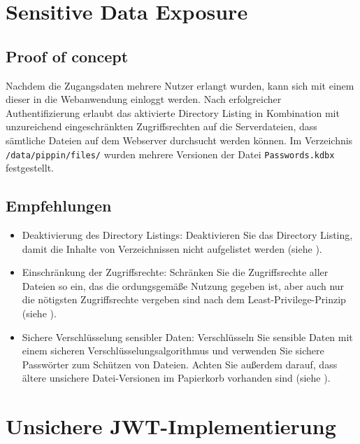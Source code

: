 \section{\makecvssbadge Sensitive Data Exposure}

\subsection*{Proof of concept}
Nachdem die Zugangsdaten mehrere Nutzer erlangt wurden, kann sich mit einem dieser in die Webanwendung einloggt werden. Nach erfolgreicher Authentifizierung erlaubt das aktivierte Directory Listing in Kombination mit unzureichend eingeschränkten Zugriffsrechten auf die Serverdateien, dass sämtliche Dateien auf dem Webserver durchsucht werden können. Im Verzeichnis \texttt{/data/pippin/files/} wurden mehrere Versionen der Datei \texttt{Passwords.kdbx} festgestellt.

\subsection*{Empfehlungen}
\begin{itemize}
    \item Deaktivierung des Directory Listings: Deaktivieren Sie das Directory Listing, damit die Inhalte von Verzeichnissen nicht aufgelistet werden (siehe \cite{owaspSecurityMisconfiguration}).
    \item Einschränkung der Zugriffsrechte: Schränken Sie die Zugriffsrechte aller Dateien so ein, das die ordungsgemäße Nutzung gegeben ist, aber auch nur die nötigsten Zugriffsrechte vergeben sind nach dem Least-Privilege-Prinzip (siehe \cite{owaspSecurityMisconfiguration}).
    \item Sichere Verschlüsselung sensibler Daten: Verschlüsseln Sie sensible Daten mit einem sicheren Verschlüsselungsalgorithmus und verwenden Sie sichere Passwörter zum Schützen von Dateien. Achten Sie außerdem darauf, dass ältere unsichere Datei-Versionen im Papierkorb vorhanden sind (siehe \cite{owaspSecurityMisconfiguration}).
\end{itemize}


\section{\makecvssbadge Unsichere JWT-Implementierung}

